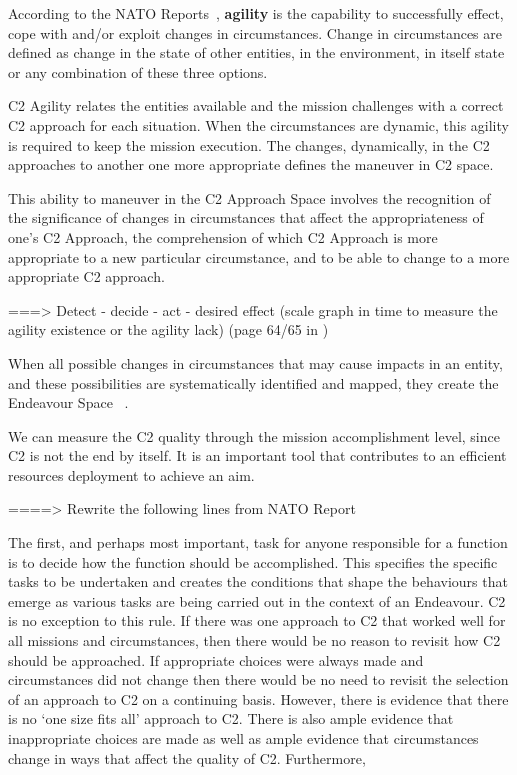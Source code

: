 According to the NATO Reports~\cite{FRANCE2014}, \textbf{agility} is the capability to successfully effect, cope with and/or exploit changes in circumstances. Change in circumstances are defined as change in the state of other entities, in the environment, in  itself state or any combination of these three options.


C2 Agility relates the entities available and the mission challenges with a correct C2 approach for each situation. When the circumstances are dynamic, this agility is required to keep the mission execution. The changes, dynamically, in the C2 approaches to another one more appropriate defines the maneuver in C2 space.

This ability to maneuver in the C2 Approach Space involves the recognition of the significance of changes in circumstances that affect the appropriateness of one’s C2 Approach, the comprehension of which C2 Approach is more appropriate to a new particular circumstance, and to be able to change to a more appropriate C2 approach.




===> Detect - decide - act - desired effect  (scale graph in time to measure the agility existence or the agility lack) (page 64/65 in \cite{FRANCE2014})

When all possible changes in circumstances that may cause impacts in an entity, and these possibilities are systematically identified and mapped, they create the Endeavour Space ~\cite{FRANCE2014}.

We can measure the C2 quality through the mission accomplishment level, since C2 is not the end by itself. It is an important tool that contributes to an efficient resources deployment to achieve an aim.


====> Rewrite the following lines from NATO Report \cite{FRANCE2014}

The first, and perhaps most important, task for anyone responsible for a function is to decide how the function should be accomplished. This specifies the specific tasks to be undertaken and creates the conditions that shape the behaviours that emerge as various tasks are being carried out in the context of an Endeavour.
C2 is no exception to this rule. If there was one approach to C2 that worked well for all missions and
circumstances, then there would be no reason to revisit how C2 should be approached. If appropriate choices were always made and circumstances did not change then there would be no need to revisit the selection of an approach to C2 on a continuing basis. However, there is evidence that there is no ‘one size fits all’ approach to C2. There is also ample evidence that inappropriate choices are made as well as ample evidence that circumstances change in ways that affect the quality of C2.
Furthermore,


